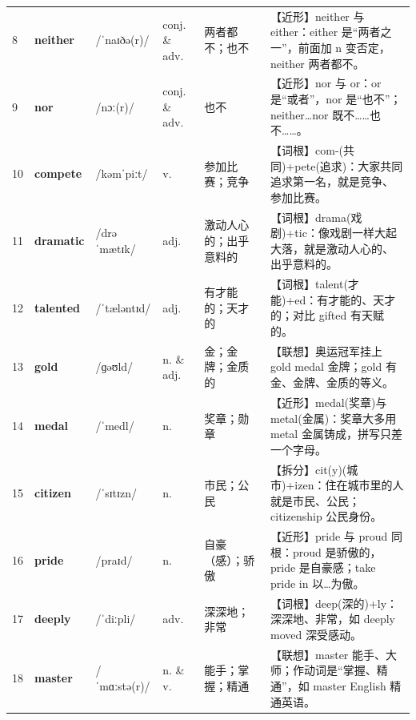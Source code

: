 \documentclass[UTF8,a4paper,11pt,oneside]{ctexbook}
\newcommand{\cellword}[1]{{\bfseries\textcolor{wordcol}{#1}}}
\newcommand{\cellipa}[1]{{\footnotesize\textcolor{ipacol}{#1}}}
\newcommand{\cellpos}[1]{\textcolor{poscol}{#1}}
\newcommand{\cellno}[1]{\textcolor{volcolor!75!black}{#1}}
\begin{document}
{\begin{longtable}{@{}C{0.045\textwidth}L{0.155\textwidth}L{0.175\textwidth}C{0.070\textwidth}L{0.180\textwidth}L{0.282\textwidth}@{}}
\cellno{8} & \cellword{neither} & \cellipa{/ˈnaɪðə(r)/} & \cellpos{conj.  \& adv.} & 两者都不；也不 & \textcolor{tagNear}{【近形】}neither 与 either：either 是“两者之一”，前面加 n 变否定，neither 两者都不。 \\
 \cellno{9} & \cellword{nor} & \cellipa{/nɔː(r)/} & \cellpos{conj.  \& adv.} & 也不 & \textcolor{tagNear}{【近形】}nor 与 or：or 是“或者”，nor 是“也不”；neither…nor 既不……也不……。 \\
\cellno{10} & \cellword{compete} & \cellipa{/kəmˈpiːt/} & \cellpos{v.} & 参加比赛；竞争 & \textcolor{tagRoot}{【词根】}com-(共同)+pete(追求)：大家共同追求第一名，就是竞争、参加比赛。 \\
 \cellno{11} & \cellword{dramatic} & \cellipa{/drəˈmætɪk/} & \cellpos{adj.} & 激动人心的；出乎意料的 & \textcolor{tagRoot}{【词根】}drama(戏剧)+tic：像戏剧一样大起大落，就是激动人心的、出乎意料的。 \\
\cellno{12} & \cellword{talented} & \cellipa{/ˈtæləntɪd/} & \cellpos{adj.} & 有才能的；天才的 & \textcolor{tagRoot}{【词根】}talent(才能)+ed：有才能的、天才的；对比 gifted 有天赋的。 \\
 \cellno{13} & \cellword{gold} & \cellipa{/ɡəʊld/} & \cellpos{n.  \& adj.} & 金；金牌；金质的 & \textcolor{tagAssoc}{【联想】}奥运冠军挂上 gold medal 金牌；gold 有金、金牌、金质的等义。 \\
\cellno{14} & \cellword{medal} & \cellipa{/ˈmedl/} & \cellpos{n.} & 奖章；勋章 & \textcolor{tagNear}{【近形】}medal(奖章)与 metal(金属)：奖章大多用 metal 金属铸成，拼写只差一个字母。 \\
 \cellno{15} & \cellword{citizen} & \cellipa{/ˈsɪtɪzn/} & \cellpos{n.} & 市民；公民 & \textcolor{tagSplit}{【拆分】}cit(y)(城市)+izen：住在城市里的人就是市民、公民；citizenship 公民身份。 \\
\cellno{16} & \cellword{pride} & \cellipa{/praɪd/} & \cellpos{n.} & 自豪（感）；骄傲 & \textcolor{tagNear}{【近形】}pride 与 proud 同根：proud 是骄傲的，pride 是自豪感；take pride in 以…为傲。 \\
 \cellno{17} & \cellword{deeply} & \cellipa{/ˈdiːpli/} & \cellpos{adv.} & 深深地；非常 & \textcolor{tagRoot}{【词根】}deep(深的)+ly：深深地、非常，如 deeply moved 深受感动。 \\
\cellno{18} & \cellword{master} & \cellipa{/ˈmɑːstə(r)/} & \cellpos{n.  \& v.} & 能手；掌握；精通 & \textcolor{tagAssoc}{【联想】}master 能手、大师；作动词是“掌握、精通”，如 master English 精通英语。 \\

\end{longtable}}
\end{document}
